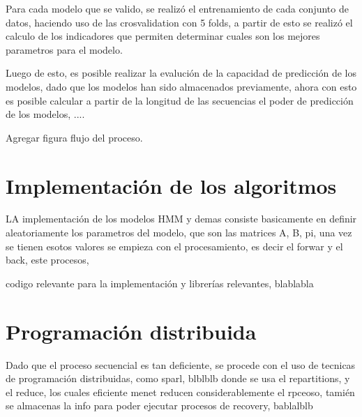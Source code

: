 Para cada modelo que se valido, se realizó el entrenamiento de cada conjunto de datos, haciendo uso de las crosvalidation con 5 folds, a partir de esto se realizó el calculo de los indicadores que permiten determinar cuales son los mejores parametros para el modelo.

Luego de esto, es posible realizar la evalución de la capacidad de predicción de los modelos, dado que los modelos han sido almacenados previamente, ahora con esto es posible calcular a partir de la longitud de las secuencias el poder de predicción de los modelos, ....

Agregar figura flujo del proceso.



\section{Implementación de los algoritmos } %
\label{section4.2}

LA implementación de los modelos HMM y demas consiste basicamente en definir aleatoriamente los parametros del modelo, que son las matrices A, B, pi, una vez se tienen esotos valores se empieza con el procesamiento, es decir el forwar y el back, este procesos, 

codigo relevante para la implementación y librerías relevantes, blablabla



\section{Programación distribuida} %
\label{section4.3}

Dado que el proceso secuencial es tan deficiente, se procede con el uso de tecnicas de programación distribuidas, como sparl, blblblb donde se usa el repartitions, y el reduce, los cuales eficiente menet reducen considerablemente el rpceoso, tamién se almacenas la info para poder ejecutar procesos de recovery, bablalblb
